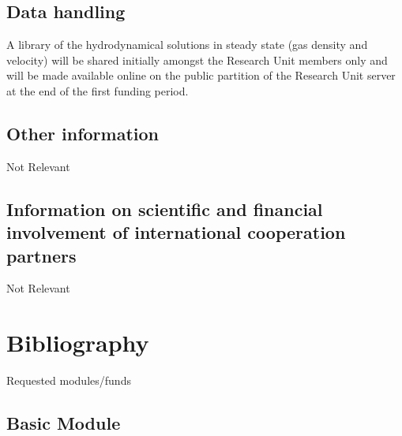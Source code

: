 \documentclass[10pt,fleqn,twoside]{article}
\begin{document}


\subsection{Data handling}

A library of the hydrodynamical solutions in steady state (gas density
and velocity)  will be shared initially amongst the Research Unit
members only and will be made available online on the public partition
of the Research Unit server at the end of the first funding period. 

\subsection{Other information}

Not Relevant

\subsection{Information on scientific and financial involvement of international cooperation partners}

Not Relevant

\section{Bibliography}

\begingroup
\renewcommand{\section}[2]{}%


\endgroup


\section{Requested modules/funds}
\renewcommand{\leftmark}{\sc  Requested modules/funds}

\subsection{Basic Module}
\end{document}
